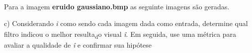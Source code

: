 \documentclass[10pt,a4paper]{article}
\begin{document}
\begin{flushleft}
Para a imagem \textbf{e\textunderscore ruido \textunderscore gaussiano.bmp} as seguinte imagens são geradas.
\end{flushleft}

\begin{figure}[H]
    \centering
    \qquad
\end{figure}

\begin{flushleft}
c) Considerando\textsubscript{ }\textit{i} como sendo cada imagem dada como entrada, determine qual filtro indicou o melhor resulta\textsubscript{d}o visual \textit{î}. Em seguida, use uma métrica para avaliar a qualidade de \textit{î} e confirmar sua hipótese
\end{flushleft}
\end{document}
